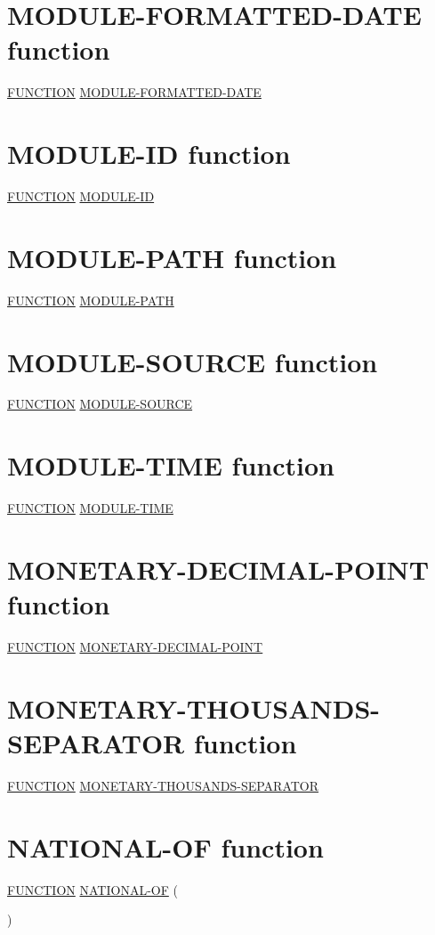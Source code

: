 \documentclass[a4paper,oneside,svgnames]{scrbook}
\makeatletter
\newcommand{\key}[1]{\underline{#1}}
\newcommand{\gnucobol}[1]{%
  \colorbox{orange!75}{#1}}
\newcommand{\pending}[1]{%
  \textcolor{gray!75}{#1}}
\newenvironment{0-1}{$\left[ \begin{tabular}{@{}l@{}}}{\end{tabular} \right]$}
\makeatother
\begin{document}
\section{MODULE-FORMATTED-DATE function}

\gnucobol{
  \key{FUNCTION} \key{MODULE-FORMATTED-DATE}
}

\section{MODULE-ID function}

\gnucobol{
  \key{FUNCTION} \key{MODULE-ID}
}

\section{MODULE-PATH function}

\gnucobol{
  \key{FUNCTION} \key{MODULE-PATH}
}

\section{MODULE-SOURCE function}

\gnucobol{
  \key{FUNCTION} \key{MODULE-SOURCE}
}

\section{MODULE-TIME function}

\gnucobol{
  \key{FUNCTION} \key{MODULE-TIME}
}

\section{MONETARY-DECIMAL-POINT function}

\gnucobol{
  \key{FUNCTION} \key{MONETARY-DECIMAL-POINT}
}

\section{MONETARY-THOUSANDS-SEPARATOR function}

\gnucobol{
  \key{FUNCTION} \key{MONETARY-THOUSANDS-SEPARATOR}
}

\section{NATIONAL-OF function}

\pending{
  \key{FUNCTION} \key{NATIONAL-OF} ( \argument
  \begin{0-1}
    \argument
  \end{0-1}
  )
}
\end{document}
